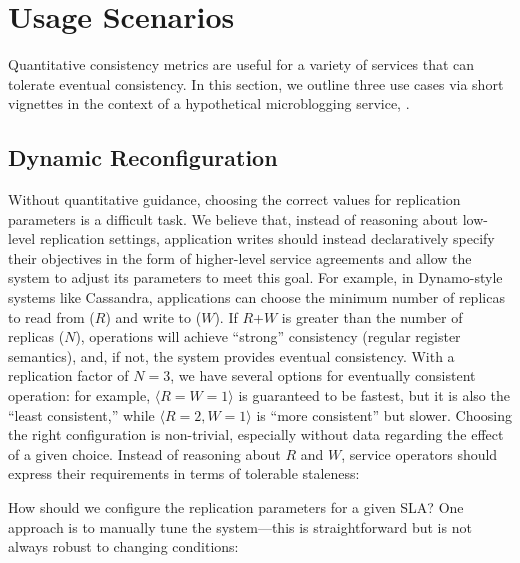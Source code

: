 \section{Usage Scenarios}
\label{sec:scenarios}

Quantitative consistency metrics are useful for a variety of services
that can tolerate eventual consistency. In this section, we outline
three use cases via short vignettes in the context of a hypothetical
microblogging service, {\systemname}.

\subsection{Dynamic Reconfiguration}
\label{sec:dynamic}

Without quantitative guidance, choosing the correct values for
replication parameters is a difficult task. We believe that, instead
of reasoning about low-level replication settings, application writes
should instead declaratively specify their objectives in the form of
higher-level service agreements and allow the system to adjust its
parameters to meet this goal. For example, in Dynamo-style systems
like Cassandra, applications can choose the minimum number of replicas
to read from ($R$) and write to ($W$). If $R$+$W$ is greater than the
number of replicas ($N$), operations will achieve ``strong''
consistency (regular register semantics), and, if not, the system
provides eventual consistency. With a replication factor of $N=3$, we
have several options for eventually consistent operation: for example,
$\langle R$$=$$W$$=$$1\rangle$ is guaranteed to be fastest, but it is
also the ``least consistent,'' while $\langle R$$=$$2$$,
W$$=$$1\rangle$ is ``more consistent'' but slower. Choosing the right
configuration is non-trivial, especially without data regarding the
effect of a given choice. Instead of reasoning about $R$ and $W$,
service operators should express their requirements in terms of tolerable staleness:


How should we configure the replication parameters for a given SLA?
One approach is to manually tune the system---this is straightforward
but is not %
always robust to changing conditions:


